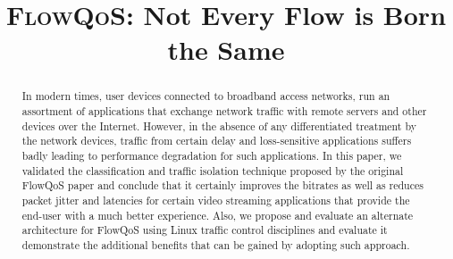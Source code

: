 \documentclass[10pt, conference, letterpaper]{IEEEtran}
\def\flowqos{\textsc{FlowQoS}\xspace}
\def\papertitle{{\fontsize{20.74}{12}\bf\scshape \flowqos}: Not Every Flow is Born
the Same}
\begin{document}
 
\title{\papertitle}


\author{
\and
{}
\and
{}
\and
{}
}


\maketitle

\begin{abstract}
In modern times, user devices connected to broadband access networks, run an assortment of applications that exchange network traffic with remote servers and other devices over the Internet. However, in the absence of any differentiated treatment by the network devices, traffic from certain delay and loss-sensitive applications suffers badly leading to performance degradation for such applications. In this paper, we validated the classification and traffic isolation technique proposed by the original FlowQoS paper and conclude that it certainly improves the bitrates as well as reduces packet jitter and latencies for certain video streaming applications that provide the end-user with a much better experience. Also, we propose and evaluate an alternate architecture for FlowQoS using Linux traffic control disciplines and evaluate it demonstrate the additional benefits that can be gained by adopting such approach.
\end{abstract}





% 
%





\raggedright
\small


 
 


 
\end{document}
